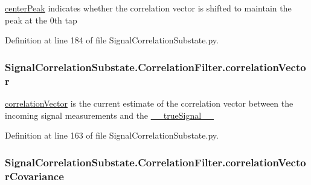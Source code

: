 \hyperlink{classSignalCorrelationSubstate_1_1CorrelationFilter_a8e53182c2ff431a6a545a265cda6ba48}{center\+Peak} indicates whether the correlation vector is shifted to maintain the peak at the 0th tap 



Definition at line 184 of file Signal\+Correlation\+Substate.\+py.

\subsubsection[{\texorpdfstring{correlation\+Vector}{correlationVector}}]{\setlength{\rightskip}{0pt plus 5cm}Signal\+Correlation\+Substate.\+Correlation\+Filter.\+correlation\+Vector}\hypertarget{classSignalCorrelationSubstate_1_1CorrelationFilter_ae308a025a3a7ebdf4e66b5fd3fdf2b7d}{}\label{classSignalCorrelationSubstate_1_1CorrelationFilter_ae308a025a3a7ebdf4e66b5fd3fdf2b7d}


\hyperlink{classSignalCorrelationSubstate_1_1CorrelationFilter_ae308a025a3a7ebdf4e66b5fd3fdf2b7d}{correlation\+Vector} is the current estimate of the correlation vector between the incoming signal measurements and the \hyperlink{classSignalCorrelationSubstate_1_1CorrelationFilter_a5f777d3a877658a1365ebac65b9ab25b}{\+\_\+\+\_\+true\+Signal\+\_\+\+\_\+} 



Definition at line 163 of file Signal\+Correlation\+Substate.\+py.

\subsubsection[{\texorpdfstring{correlation\+Vector\+Covariance}{correlationVectorCovariance}}]{\setlength{\rightskip}{0pt plus 5cm}Signal\+Correlation\+Substate.\+Correlation\+Filter.\+correlation\+Vector\+Covariance}\hypertarget{classSignalCorrelationSubstate_1_1CorrelationFilter_a484e6bdabe405d0aba1dcf4d5729dd72}{}\label{classSignalCorrelationSubstate_1_1CorrelationFilter_a484e6bdabe405d0aba1dcf4d5729dd72}


